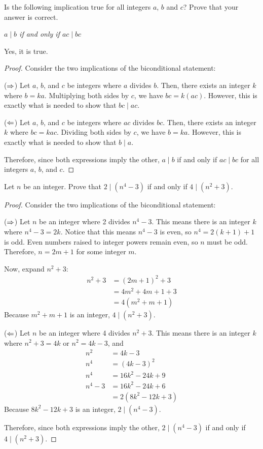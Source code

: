\question Is the following implication true for all integers $a$, $b$ and $c$? Prove that your answer is correct.
\begin{center}
  \emph{$a \mid b$ if and only if $ac \mid bc$}
\end{center}
Yes, it is true.
\begin{proof}
  Consider the two implications of the biconditional statement:

  ($\Rightarrow$) Let $a$, $b$, and $c$ be integers where $a$ divides $b$.
  Then, there exists an integer $k$ where $b = ka$.
  Multiplying both sides by $c$, we have $bc = k(ac)$.
  However, this is exactly what is needed to show that $bc \mid ac$.

  ($\Leftarrow$) Let $a$, $b$, and $c$ be integers where $ac$ divides $bc$.
  Then, there exists an integer $k$ where $bc = kac$.
  Dividing both sides by $c$, we have $b = ka$.
  However, this is exactly what is needed to show that $b \mid a$.

  Therefore, since both expressions imply the other, $a \mid b$ if and only if $ac \mid bc$ for all integers $a$, $b$, and $c$.
\end{proof}


\question Let $n$ be an integer. Prove that $2 \mid (n^4 - 3)$ if and only if $4 \mid (n^2 + 3)$.
\begin{proof}
  Consider the two implications of the biconditional statement:

  ($\Rightarrow$) Let $n$ be an integer where 2 divides $n^4 - 3$.
  This means there is an integer $k$ where $n^4-3 = 2k$.
  Notice that this means $n^4-3$ is even, so $n^4=2(k+1)+1$ is odd.
  Even numbers raised to integer powers remain even, so $n$ must be odd.
  Therefore, $n = 2m+1$ for some integer $m$.

  Now, expand $n^2+3$:
  \begin{align*}
    n^2 + 3 & = (2m+1)^2 + 3      \\
            & = 4m^2 + 4m + 1 + 3 \\
            & = 4(m^2 + m + 1)
  \end{align*}
  Because $m^2 + m + 1$ is an integer, $4 \mid (n^2 + 3)$.

  ($\Leftarrow$) Let $n$ be an integer where 4 divides $n^2 + 3$.
  This means there is an integer $k$ where $n^2 + 3 = 4k$ or $n^2 = 4k-3$, and
  \begin{align*}
    n^2     & = 4k-3              \\
    n^4     & = (4k-3)^2          \\
    n^4     & = 16k^2 - 24k + 9   \\
    n^4 - 3 & = 16k^2 - 24k + 6   \\
            & = 2(8k^2 - 12k + 3)
  \end{align*}
  Because $8k^2 - 12k + 3$ is an integer, $2 \mid (n^4 - 3)$.

  Therefore, since both expressions imply the other, $2 \mid (n^4 - 3)$ if and only if $4 \mid (n^2 + 3)$.
\end{proof}


